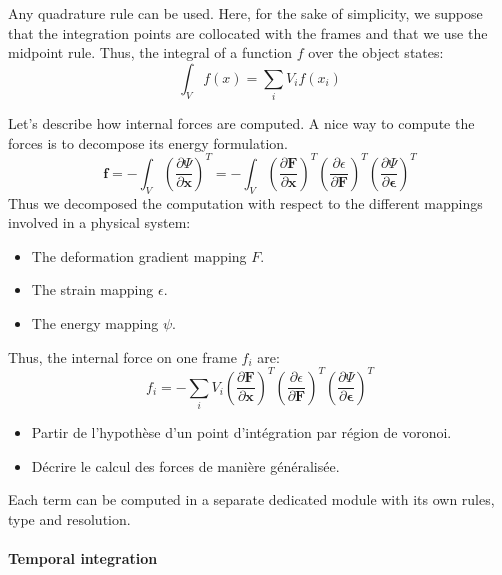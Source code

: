 Any quadrature rule can be used. Here, for the sake of simplicity, we suppose that the integration points are collocated with the frames and that we use the midpoint rule. Thus, the integral of a function $f$ over the object states:
\begin{equation}
\int_{V} f(x)  = \sum_{i} V_{i} f(x_{i})
\end{equation}

Let's describe how internal forces are computed. A nice way to compute the forces is to decompose its energy formulation.
\begin{equation}
\mathbf{f} = - \int_{V} \left( \frac{\partial \Psi}{\partial \mathbf{x}} \right)^{T} =
- \int_{V} 
\left( \frac{\partial \mathbf{F}}{\partial \mathbf{x}} \right)^{T}
\left( \frac{\partial \epsilon}{\partial \mathbf{F}} \right)^{T}
\left( \frac{\partial \Psi}{\partial \mathbf{\epsilon}} \right)^{T}
\end{equation}
Thus we decomposed the computation with respect to the different mappings involved in a physical system:
\begin{itemize}
\item The deformation gradient mapping $F$.
\item The strain mapping $\epsilon$.
\item The energy mapping $\psi$.
\end{itemize}

Thus, the internal force on one frame $f_{i}$ are:
\begin{equation}
f_{i} = - \sum_{i} V_{i} \left( \frac{\partial \mathbf{F}}{\partial \mathbf{x}} \right)^{T}
\left( \frac{\partial \epsilon}{\partial \mathbf{F}} \right)^{T}
\left( \frac{\partial \Psi}{\partial \mathbf{\epsilon}} \right)^{T}
\end{equation}

\begin{itemize}
\item Partir de l'hypothèse d'un point d'intégration par région de voronoi.
\item Décrire le calcul des forces de manière généralisée.
\end{itemize}

Each term can be computed in a separate dedicated module with its own rules, type and resolution.

\paragraph{Temporal integration}

